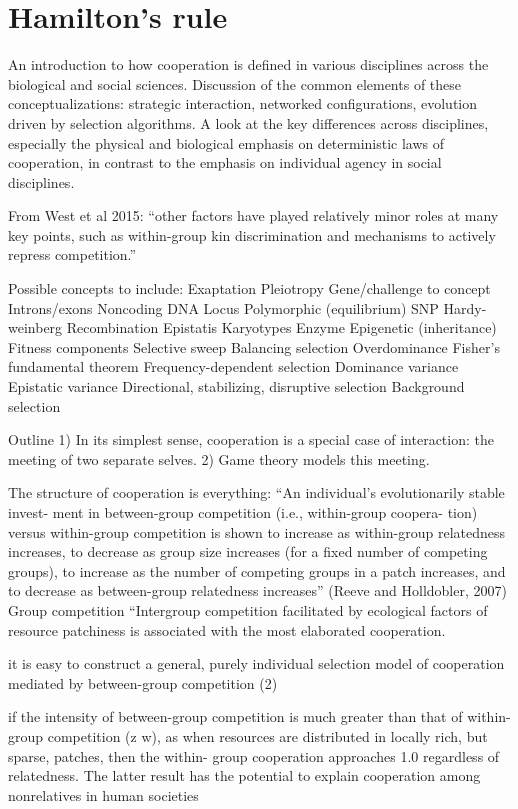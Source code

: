 \documentclass{tufte-book} %
\begin{document}
\section{Hamilton's rule}\label{ham-rule}

An introduction to how cooperation is defined in various disciplines across the biological and social sciences. Discussion of the common elements of these conceptualizations: strategic interaction, networked configurations, evolution driven by selection algorithms. A look at the key differences across disciplines, especially the physical and biological emphasis on deterministic laws of cooperation, in contrast to the emphasis on individual agency in social disciplines.

From West et al 2015: “other factors have played relatively minor roles at many key points, such as within-group kin discrimination and mechanisms to actively repress competition.”

Possible concepts to include:
Exaptation
Pleiotropy
Gene/challenge to concept
Introns/exons
Noncoding DNA
Locus
Polymorphic (equilibrium)
SNP
Hardy-weinberg
Recombination
Epistatis
Karyotypes
Enzyme
Epigenetic (inheritance)
Fitness components
Selective sweep
Balancing selection
Overdominance
Fisher’s fundamental theorem
Frequency-dependent selection
Dominance variance
Epistatic variance
Directional, stabilizing, disruptive selection
Background selection


Outline
	1)	In its simplest sense, cooperation is a special case of interaction: the meeting of two separate selves.
	2)	Game theory models this meeting.

The structure of cooperation is everything: “An individual’s evolutionarily stable invest- ment in between-group competition (i.e., within-group coopera- tion) versus within-group competition is shown to increase as within-group relatedness increases, to decrease as group size increases (for a fixed number of competing groups), to increase as the number of competing groups in a patch increases, and to decrease as between-group relatedness increases” (Reeve and Holldobler, 2007)
Group competition
“Intergroup competition facilitated by ecological factors of resource patchiness is associated with the most elaborated cooperation.

it is easy to construct a general, purely individual selection model of cooperation mediated by between-group competition (2)

if the intensity of between-group competition is much greater than that of within-group competition (z w), as when resources are distributed in locally rich, but sparse, patches, then the within- group cooperation approaches 1.0 regardless of relatedness. The latter result has the potential to explain cooperation among nonrelatives in human societies
\end{document}
